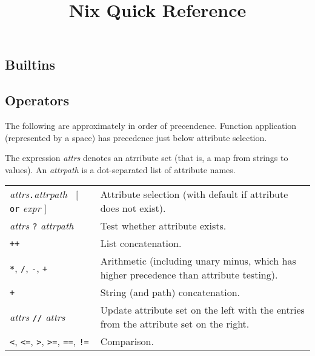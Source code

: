 \documentclass[9pt, a4paper, landscape]{extarticle}
\title{Nix Quick Reference}
\date{\vskip-10ex November 2023}
\newcommand{\cmd}[1]{\texttt{#1}}
\begin{document}
\begin{multicols*}{3}\raggedcolumns%
\maketitle

\section*{Builtins}

\subsection*{Operators}

The following are approximately in order of precendence. Function
application (represented by a space) has precedence just below
attribute selection.

The expression \emph{attrs} denotes an atrribute set (that is, a map
from strings to values). An \emph{attrpath} is a dot-separated list of
attribute names.

\begin{tabularx}{\columnwidth}{@{}l>{\raggedright\arraybackslash}X@{}}

  \parbox[t]{8em}{\emph{attrs}\texttt{.}\emph{attrpath} \\
    ${}\;\;[$ \texttt{or} \emph{expr} $]$}
  & Attribute selection (with default if attribute does not exist). \\

  \emph{attrs} \texttt{?} \emph{attrpath} & Test whether attribute
  exists. \\

  \cmd{++} & List concatenation. \\
  
  \cmd{*}, \cmd{/}, \cmd{-}, \cmd{+} & Arithmetic (including unary
  minus, which has higher precedence than attribute testing). \\
  
  \cmd{+} & String (and path) concatenation. \\

  \emph{attrs} \cmd{//} \emph{attrs} & Update attribute set on the
  left with the entries from the attribute set on the right. \\
  
  \cmd{<}, \cmd{<=}, \cmd{>}, \cmd{>=}, \cmd{==}, \cmd{!=} &
  Comparison. \\


\end{tabularx}
\end{multicols*}
\end{document}
